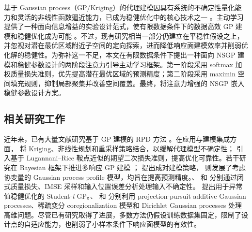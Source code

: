 \documentclass[]{interact}
\theoremstyle{plain}%
\theoremstyle{definition}
\theoremstyle{remark}
\begin{document}
基于 Gaussian process（GP/Kriging）的代理建模因具有系统的不确定性量化能力和灵活的非线性函数逼近能力，已成为稳健优化中的核心技术之一 \citep{Williams2006, Ankenman2010, Santner2018, Liu2025}。主动学习提供了一种面向信息增益的实验设计范式，使有限数据条件下的数据高效 GP 建模和稳健优化成为可能 \citep{Wang2025, Feng2025}。不过，现有研究相当一部分仍建立在平稳性假设之上，并忽视对潜在最优区域附近子空间的定向探索，进而降低响应面建模效率并削弱优化解的稳健性。为弥补这一不足，本文在有限数据条件下提出一种面向 NSGP 建模和稳健参数设计的两阶段注意力引导主动学习框架。第一阶段采用 softmax 加权质量损失准则，优先提高潜在最优区域的预测精度；第二阶段采用 maximin 空间填充规则，抑制局部聚集并改善空间覆盖。最终，将注意力增强的 NSGP 嵌入稳健参数设计方案。

\subsection{相关研究工作}
近年来，已有大量文献研究基于 GP 建模的 RPD 方法 \citep{Jiang2021}。在应用与建模集成方面，\citet{Dellino2012} 将 Kriging、非线性规划和重采样策略结合，以缓解代理模型不确定性；\citet{Tan2012} 引入基于 Lugannani--Rice 鞍点近似的期望二次损失准则，提高优化可靠性。若干研究在 Bayesian 框架下推进多响应 GP 建模 \citep{Alshraideh2014, Kleijnen2014}；\citet{Li2016} 提出成对建模策略，\citet{Ding2024} 则发展了考虑协变量的 Gaussian process profile 模型，均旨在提高预测精度。\citet{Han2016}、\citet{Wang2019} 和 \citet{Wang2022} 分别通过闭式质量损失、IMSE 采样和输入位置误差分析处理输入不确定性。\citet{Feng2021} 提出用于异常值稳健优化的 Student-\emph{t} GP。\citet{Chen2022}、\citet{Barde2024} 和 \citet{Zhou2025} 分别利用 projection-pursuit additive Gaussian processes、稀疏变分 coregionalization 模型和 Dirichlet Gaussian processes 处理高维问题。尽管已有研究取得了进展，多数方法仍假设训练数据集固定，限制了设计点的自适应能力，也削弱了小样本条件下响应面模型的有效性。
\end{document}
